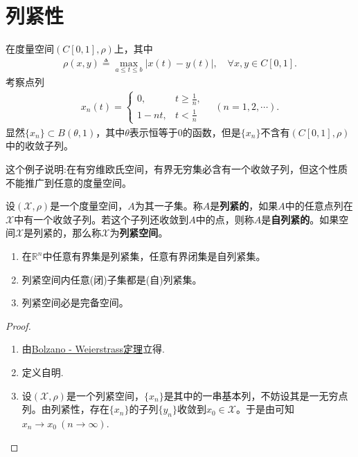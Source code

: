 \documentclass[../../main.tex]{subfiles}%
\begin{document}
\section{列紧性}

\begin{examples}
在度量空间$(C[0,1],\rho)$上，其中
\begin{align*}
\rho(x,y) \triangleq \max_{a \leqslant t \leqslant b} |x(t) - y(t)|,\quad \forall x,y\in C[0,1].
\end{align*}
考察点列
\begin{align*}
x_n(t)=
\begin{cases}
0, & t\geqslant\frac{1}{n}, \\
1-nt, & t<\frac{1}{n}
\end{cases}
\quad (n=1,2,\cdots).
\end{align*}
显然$\{x_n\}\subset B(\theta,1)$，其中$\theta$表示恒等于0的函数，但是$\{x_n\}$不含有$(C[0,1],\rho)$中的收敛子列。
\end{examples}
\begin{remark}
这个例子说明:在有穷维欧氏空间，有界无穷集必含有一个收敛子列，但这个性质不能推广到任意的度量空间。
\end{remark}

\begin{definition}
设$(\mathscr{X},\rho)$是一个度量空间，$A$为其一子集。称$A$是\textbf{列紧的}，如果$A$中的任意点列在$\mathscr{X}$中有一个收敛子列。若这个子列还收敛到$A$中的点，则称$A$是\textbf{自列紧的}。如果空间$\mathscr{X}$是列紧的，那么称$\mathscr{X}$为\textbf{列紧空间}。
\end{definition}

\begin{theorem}\label{theorem:列紧的基本性质}
\begin{enumerate}[(1)]
\item\label{theorem:列紧的基本性质-1} 在$\mathbb{R}^n$中任意有界集是列紧集，任意有界闭集是自列紧集。

\item\label{theorem:列紧的基本性质-2} 列紧空间内任意(闭)子集都是(自)列紧集。

\item\label{theorem:列紧的基本性质-3} 列紧空间必是完备空间。
\end{enumerate}
\end{theorem}
\begin{proof}
\begin{enumerate}[(1)]
\item 由\hyperref[Real-Analysis-theorem:R^n中的Bolzano - Weierstrass定理]{Bolzano - Weierstrass定理}立得.

\item 定义自明.

\item 设$(\mathscr{X},\rho)$是一个列紧空间，$\{x_n\}$是其中的一串基本列，不妨设其是一无穷点列。由列紧性，存在$\{x_n\}$的子列$\{y_n\}$收敛到$x_0\in\mathscr{X}$。于是由可知$x_n\to x_0\ (n\to\infty)$.
\end{enumerate}
\end{proof}
\end{document}
